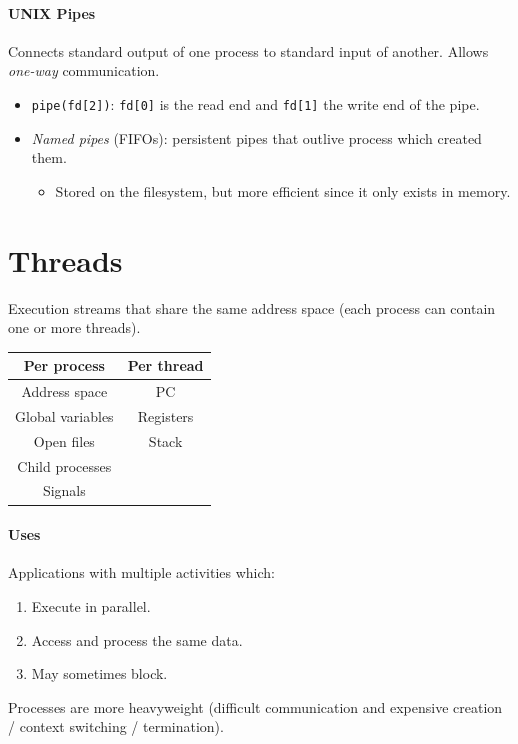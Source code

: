 \documentclass[twocolumn,english]{article}
\providecommand{\tabularnewline}{\\}
\providecommand{\tabularnewline}{\\}
\begin{document}
\paragraph{UNIX Pipes}

Connects standard output of one process to standard input of another.
Allows \emph{one-way} communication.
\begin{itemize}
\item \texttt{pipe(fd{[}2{]})}: \texttt{fd{[}0{]}} is the read end and \texttt{fd{[}1{]}}
the write end of the pipe.
\item \emph{Named pipes} (FIFOs): persistent pipes that outlive process
which created them.
\begin{itemize}
\item Stored on the filesystem, but more efficient since it only exists
in memory.
\end{itemize}
\end{itemize}

\section{Threads}

Execution streams that share the same address space (each process
can contain one or more threads).

\begin{table}[H]
\centering{}%
\begin{tabular}{cc}
\toprule 
\textbf{Per process} & \textbf{Per thread}\tabularnewline
\midrule
Address space & PC\tabularnewline
Global variables & Registers\tabularnewline
Open files & Stack\tabularnewline
Child processes & \tabularnewline
Signals & \tabularnewline
\bottomrule
\end{tabular}
\end{table}

\paragraph{Uses}

Applications with multiple activities which:
\begin{enumerate}
\item Execute in parallel.
\item Access and process the same data.
\item May sometimes block.
\end{enumerate}
Processes are more heavyweight (difficult communication and expensive
creation / context switching / termination).
\end{document}
